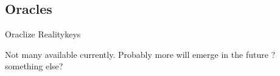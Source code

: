 \subsection{Oracles}
Oraclize
Realitykeys

Not many available currently. Probably more will emerge in the future
?something else?
